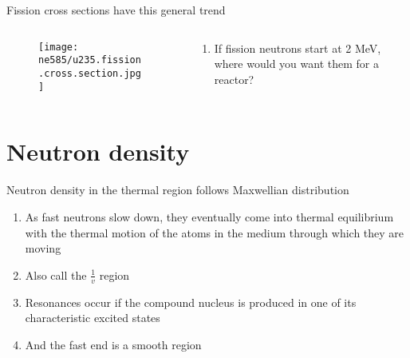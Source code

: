 \documentclass[aspectratio=1610,pdftex,dvipsnames,compress,xcolor={dvipsnames}]{beamer}
\begin{document}
\addtocounter{framenumber}{-2} 
\begin{frame}{Fission cross sections have this general trend}
    \begin{columns}

        \begin{column}{0.60\textwidth}
            \begin{figure}
                \centering
                \texttt{[image: ne585/u235.fission.cross.section.jpg]}
            \end{figure}
        \end{column}

        \begin{column}{0.40\textwidth}
            \begin{enumerate}[series=outerlist,topsep=0pt,itemsep=21pt,leftmargin=*,label=(\arabic*)]
                \item[]If fission neutrons start at 2 MeV, where would you want them for a reactor?
            \end{enumerate}
        \end{column}

    \end{columns}
\end{frame}


\section{Neutron density}


\addtocounter{framenumber}{-1} 
\begin{frame}{Neutron density in the thermal region follows Maxwellian distribution}
    \begin{enumerate}[series=outerlist,topsep=0pt,itemsep=21pt,leftmargin=*,label=(\arabic*)]
        \item[]As fast neutrons slow down, they eventually come into thermal equilibrium with the thermal motion of the atoms in the medium through which they are moving
        \item[]Also call the $\frac{1}{v}$ region
        \item[]Resonances occur if the compound nucleus is produced in one of its characteristic excited states
        \item[]And the fast end is a smooth region
    \end{enumerate}
\end{frame}
\end{document}
